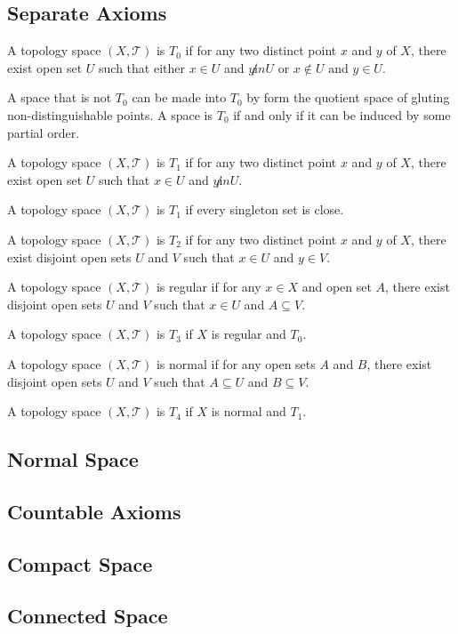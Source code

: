\subsection{Separate Axioms}
\begin{defi}[$T_0$]
A topology space $(X, \mathcal{T})$ is $T_0$ if for any two distinct point $x$ and $y$ of $X$,
there exist open set $U$ such that either $x \in U$ and $y \not in U$ or $x \notin U$
and $y \in U$.
\end{defi}
\begin{rem}
A space that is not $T_0$ can be made into $T_0$ by form the quotient space of
gluting non-distinguishable points.
A space is $T_0$ if and only if it can be induced by some partial order.
\end{rem}
\begin{defi}[$T_1$]
A topology space $(X, \mathcal{T})$ is $T_1$ if for any two distinct point $x$ and $y$ of $X$,
there exist open set $U$ such that $x \in U$ and $y \not in U$.
\end{defi}
\begin{rem}
A topology space $(X, \mathcal{T})$ is $T_1$ if every singleton set is close.
\end{rem}
\begin{defi}[$T_2$, Hausdorff]
A topology space $(X, \mathcal{T})$ is $T_2$ if for any two distinct point $x$ and $y$ of $X$,
there exist disjoint open sets $U$ and $V$ such that $x \in U$ and $y \in V$.
\end{defi}
\begin{defi}[Regular]
A topology space $(X, \mathcal{T})$ is regular if for any $x \in X$ and open set $A$,
there exist disjoint open sets $U$ and $V$ such that $x \in U$ and $A \subseteq V$.
\end{defi}
\begin{defi}[$T_3$]
A topology space $(X, \mathcal{T})$ is $T_3$ if $X$ is regular and $T_0$.
\end{defi}
\begin{defi}[normal]
A topology space $(X, \mathcal{T})$ is normal if for any open sets $A$ and $B$,
there exist disjoint open sets $U$ and $V$ such that $A \subseteq U$ and $B \subseteq V$.
\end{defi}
\begin{defi}[$T_4$]
A topology space $(X, \mathcal{T})$ is $T_4$ if $X$ is normal and $T_1$.
\end{defi}
\subsection{Normal Space}
\begin{pro}
\end{pro}

\subsection{Countable Axioms}
\subsection{Compact Space}
\subsection{Connected Space}
